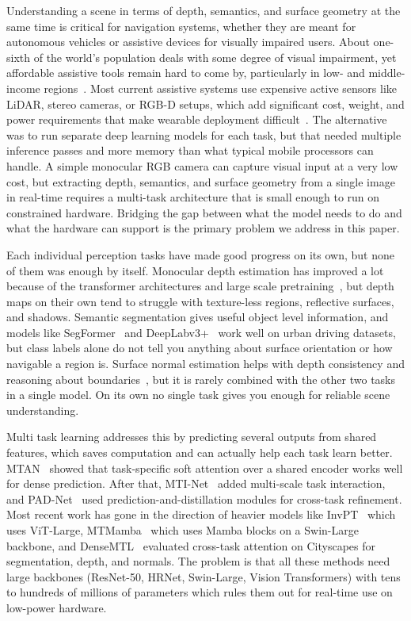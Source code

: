 \documentclass[journal, onecolumn]{IEEEtran}
\begin{document}
Understanding a scene in terms of depth, semantics, and surface geometry at the same time is critical for navigation systems, whether they are meant for autonomous vehicles or assistive devices for visually impaired users. About one-sixth of the world's population deals with some degree of visual impairment, yet affordable assistive tools remain hard to come by, particularly in low- and middle-income regions~\cite{messaoudi2022review}. Most current assistive systems use expensive active sensors like LiDAR, stereo cameras, or RGB-D setups, which add significant cost, weight, and power requirements that make wearable deployment difficult~\cite{abidi2024review}. The alternative was to run separate deep learning models for each task, but that needed multiple inference passes and more memory than what typical mobile processors can handle. A simple monocular RGB camera can capture visual input at a very low cost, but extracting depth, semantics, and surface geometry from a single image in real-time requires a multi-task architecture that is small enough to run on constrained hardware. Bridging the gap between what the model needs to do and what the hardware can support is the primary problem we address in this paper.

Each individual perception tasks have made good progress on its own, but none of them was enough by itself. Monocular depth estimation has improved a lot because of the transformer architectures and large scale pretraining~\cite{ranftl2021dense, yang2024depthanything}, but depth maps on their own tend to struggle with texture-less regions, reflective surfaces, and shadows. Semantic segmentation gives useful object level information, and models like SegFormer~\cite{xie2021segformer} and DeepLabv3+~\cite{chen2018deeplabv3plus} work well on urban driving datasets, but class labels alone do not tell you anything about surface orientation or how navigable a region is. Surface normal estimation helps with depth consistency and reasoning about boundaries~\cite{bansal2016normal}, but it is rarely combined with the other two tasks in a single model. On its own no single task gives you enough for reliable scene understanding.

Multi task learning addresses this by predicting several outputs from shared features, which saves computation and can actually help each task learn better. MTAN~\cite{liu2019mtan} showed that task-specific soft attention over a shared encoder works well for dense prediction. After that, MTI-Net~\cite{vandenhende2020mti} added multi-scale task interaction, and PAD-Net~\cite{xu2018padnet} used prediction-and-distillation modules for cross-task refinement. Most recent work has gone in the direction of heavier models like InvPT~\cite{ye2022invpt} which uses ViT-Large, MTMamba~\cite{lin2024mtmamba} which uses Mamba blocks on a Swin-Large backbone, and DenseMTL~\cite{lopes2023densemtl} evaluated cross-task attention on Cityscapes for segmentation, depth, and normals. The problem is that all these methods need large backbones (ResNet-50, HRNet, Swin-Large, Vision Transformers) with tens to hundreds of millions of parameters which rules them out for real-time use on low-power hardware.
\end{document}
